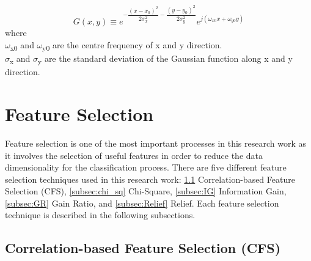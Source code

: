 \documentclass[review]{elsarticle}
\begin{document}
\begin{equation}
G(x,y)\equiv e^{-{\dfrac{(x-x_0)^2}{2\sigma^2_x}-\dfrac{(y-y_0)^2}{2\sigma^2_y}}} e^{j(\omega_{x0}x+\omega_{y0}y)}
\label{eq:Gabor}
\end{equation}
where \\
$\omega$\textsubscript{x0}   and   $\omega$\textsubscript{y0} \hspace{0.2cm}   are the centre frequency of x and y direction.\\
$\sigma$\textsubscript{x}    and   $\sigma$\textsubscript{y}   \hspace{0.5cm}  are the standard deviation of the Gaussian function along x and y direction. 


\section{Feature Selection}

Feature selection is one of the most important processes in this research work as it involves the selection of useful features in order to reduce the data dimensionality for the classification process. There are five different feature selection techniques used in this research work: \ref{subsec:CFS} Correlation-based Feature Selection (CFS), \ref{subsec:chi_sq} Chi-Square, \ref{subsec:IG} Information Gain, \ref{subsec:GR} Gain Ratio,  and \ref{subsec:Relief} Relief. Each feature selection technique is described in the following subsections.

\subsection{Correlation-based Feature Selection (CFS)}
\label{subsec:CFS}
\end{document}
